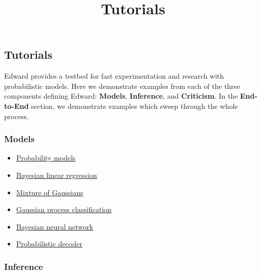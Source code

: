 \title{Tutorials}

\subsection{Tutorials}

Edward provides a testbed for fast experimentation and research with
probabilistic models. Here we demonstrate examples from each of the
three components defining Edward: \textbf{Models}, \textbf{Inference},
and \textbf{Criticism}.
In the \textbf{End-to-End} section, we demonstrate examples which
sweep through the whole process.

\subsubsection{Models}

\begin{itemize}
\item \href{tut_model.html}{Probability models}
\item \href{tut_bayesian_linear_regression.html}{Bayesian linear regression}
\item \href{tut_mixture_gaussian.html}{Mixture of Gaussians}
\item \href{tut_gp_classification.html}{Gaussian process classification}
\item \href{tut_bayesian_nn.html}{Bayesian neural network}
\item \href{tut_decoder.html}{Probabilistic decoder}
\end{itemize}

\subsubsection{Inference}

